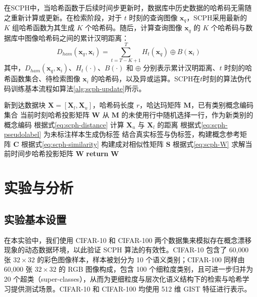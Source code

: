在SCPH中，当哈希函数于后续时间步更新时，数据库中历史数据的哈希码无需随之重新计算或更新。在检索阶段，对于 $t$ 时刻的查询图像 $\mathbf{x}_q$，SCPH采用最新的 $K$ 组哈希函数为其生成 $K$ 个哈希码。随后，计算查询图像 $\mathbf{x}_q$ 的 $K$ 个哈希码与数据库中图像哈希码之间的累计汉明距离：
\begin{equation}
  D_{ham}(\mathbf{x}_q, \mathbf{x}_i) = \sum_{t=T-K+1}^T H_t(\mathbf{x}_q) \oplus B(\mathbf{x}_i)
\end{equation}
其中，$D_{ham}(\mathbf{x}_q, \mathbf{x}_i)$、$H_t(\cdot)$、$B(\cdot)$ 和 $\oplus$ 分别表示累计汉明距离、$t$ 时刻的哈希函数集合、待检索图像 $\mathbf{x}_i$ 的哈希码，以及异或运算。SCPH在$t$时刻的算法伪代码训练基本流程如算法\ref{alg:scph-update}所示。
\vspace{0.3\baselineskip}
\begingroup
\setlength{\intextsep}{4pt}
\begin{algorithm}[H]
  \caption{在 $t$时刻，SCPH 算法伪代码}
  \label{alg:scph-update}
  \begin{algorithmic}[1]
    \REQUIRE 新到达数据块 $\mathbf{X}=[\mathbf{X}_l,\mathbf{X}_u]$，哈希码长度 $r$，哈达玛矩阵 $\mathbf{M}$，已有类别概念编码集合
    \ENSURE 当前时刻哈希投影矩阵 $\mathbf{W}$
      \STATE 从 $\mathbf{M}$ 的未使用行中随机选择一行，作为新类别的概念编码
    \ENDIF
    \STATE 根据式\eqref{eq:scph-distance} 计算 $\mathbf{X}_u$ 与 $\mathbf{X}_l$ 的距离
    \STATE 根据式\eqref{eq:scph-pseudolabel} 为未标注样本生成伪标签
    \STATE 结合真实标签与伪标签，构建概念参考矩阵 $\mathbf{C}$
    \STATE 根据式\eqref{eq:scph-similarity} 构建成对相似性矩阵 $\mathbf{S}$
    \STATE 根据式\eqref{eq:scph-W} 求解当前时间步哈希投影矩阵 $\mathbf{W}$
    \STATE \textbf{return} $\mathbf{W}$
  \end{algorithmic}
\end{algorithm}
\endgroup

\section{实验与分析}

\subsection{实验基本设置}

在本实验中，我们使用 CIFAR-10 和 CIFAR-100 两个数据集来模拟存在概念漂移现象的动态数据环境，以此验证 SCPH 算法的有效性。CIFAR-10 包含了 60,000 张 $32 \times 32$ 的彩色图像样本，样本被划分为 10 个语义类别；CIFAR-100 同样由 60,000 张 $32 \times 32$ 的 RGB 图像构成，包含 100 个细粒度类别，且可进一步归并为 20 个超类（super-classes），从而为更细粒度与层次化语义结构下的检索与哈希学习提供测试场景。CIFAR-10 和 CIFAR-100 均使用 512 维 GIST 特征进行表示。

